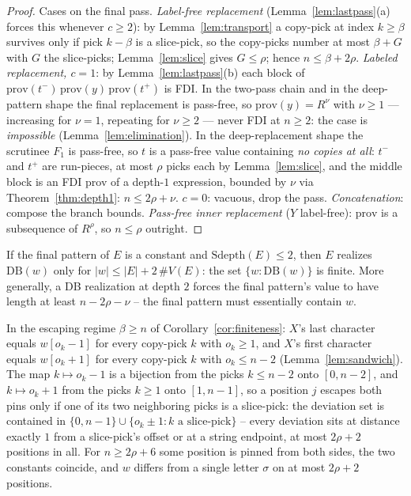 \begin{proof}
    Cases on the final pass.  \emph{Label-free replacement}
    (Lemma~\ref{lem:lastpass}(a) forces this whenever $c \geq 2$):
    by Lemma~\ref{lem:transport} a copy-pick at index $k \geq
    \beta$ survives only if pick $k-\beta$ is a slice-pick, so the
    copy-picks number at most $\beta + G$ with $G$ the slice-picks;
    Lemma~\ref{lem:slice} gives $G \leq \rho$; hence $n \leq \beta +
    2\rho$.  \emph{Labeled replacement, $c = 1$}: by
    Lemma~\ref{lem:lastpass}(b) each block of
    $\mathrm{prov}(t^-)\,\mathrm{prov}(y)\,\mathrm{prov}(t^+)$ is FDI.
    In the two-pass chain and in the deep-pattern shape the final
    replacement is pass-free, so $\mathrm{prov}(y) = R^{\nu}$ with
    $\nu \geq 1$ — increasing for $\nu = 1$, repeating for $\nu \geq
    2$ — never FDI at $n \geq 2$: the case is
    \emph{impossible} (Lemma~\ref{lem:elimination}).  In the
    deep-replacement shape the scrutinee $F_1$ is pass-free, so $t$
    is a pass-free value containing \emph{no copies at all}: $t^-$
    and $t^+$ are run-pieces, at most $\rho$ picks each by
    Lemma~\ref{lem:slice}, and the middle block is an FDI prov of a
    depth-$1$ expression, bounded by $\nu$ via
    Theorem~\ref{thm:depth1}: $n \leq 2\rho + \nu$.
    \emph{$c = 0$}: vacuous, drop the pass.  \emph{Concatenation}:
    compose the branch bounds.  \emph{Pass-free inner replacement}
    ($Y$ label-free): $\mathrm{prov}$ is a subsequence of $R^{\rho}$,
    so $n \leq \rho$ outright.
\end{proof}

\begin{corollary}
    \label{cor:finiteness}
    If the final pattern of $E$ is a constant and
    $\mathrm{Sdepth}(E) \leq 2$, then $E$ realizes
    $\mathrm{DB}(w)$ only for $|w| \leq |E| + 2\,\#V(E)$: the set
    $\{w : \mathrm{DB}(w)\}$ is finite.  More generally, a DB
    realization at depth $2$ forces the final pattern's value to have
    length at least $n - 2\rho - \nu$ -- the final pattern must
    essentially contain $w$.
\end{corollary}

\begin{lemma}[pinch]
    \label{lem:pinch}
    In the escaping regime $\beta \geq n$ of
    Corollary~\ref{cor:finiteness}: $X$'s last character equals
    $w[o_k - 1]$ for every copy-pick $k$ with $o_k \geq 1$, and $X$'s
    first character equals $w[o_k + 1]$ for every copy-pick $k$ with
    $o_k \leq n-2$ (Lemma~\ref{lem:sandwich}).  The map $k \mapsto
    o_k - 1$ is a bijection from the picks $k \leq n-2$ onto
    $[0, n-2]$, and $k \mapsto o_k + 1$ from the picks $k \geq 1$ onto
    $[1, n-1]$, so a position $j$ escapes both pins only if one of its
    two neighboring picks is a slice-pick: the deviation set is
    contained in $\{0, n-1\} \cup \{o_k \pm 1 : \text{$k$ a
    slice-pick}\}$ -- every deviation sits at distance exactly $1$
    from a slice-pick's offset or at a string endpoint, at most
    $2\rho + 2$ positions in all.  For $n \geq 2\rho + 6$ some
    position is pinned from both sides, the two constants coincide,
    and $w$ differs from a single letter $\sigma$ on at most
    $2\rho + 2$ positions.
\end{lemma}

